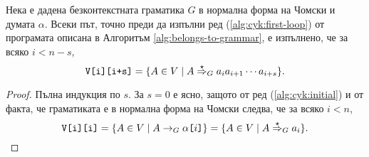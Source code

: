 \begin{lemma}
  Нека е дадена безконтекстната граматика $G$ в нормална форма на Чомски и думата $\alpha$.
  Всеки път, точно преди да изпълни ред (\ref{alg:cyk:first-loop}) от програмата описана в Алгоритъм \ref{alg:belongs-to-grammar},
  е изпълнено, че за всяко $i < n-s$,
  \[\texttt{V[i][i+s]} = \{A \in V \mid A \stackrel{{\star}}{\Rightarrow}_G a_ia_{i+1}\cdots a_{i+s}\}.\]
\end{lemma}
\begin{proof}
  Пълна индукция по $s$.
  За $s = 0$ е ясно, защото от ред (\ref{alg:cyk:initial}) и от факта, че граматиката е в нормална форма на Чомски следва, че за всяко $i < n$, 
  \[\texttt{V[i][i]} = \{A \in V \mid A \to_G \alpha\texttt{[}{i}\texttt{]}\} = \{A \in V \mid A \stackrel{{\star}}{\Rightarrow}_G a_i\}.\]
  

\end{proof}
